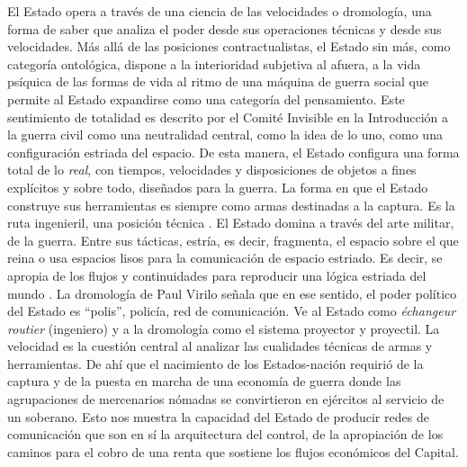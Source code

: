El Estado opera a través de una ciencia de las velocidades o dromología, una forma de saber que analiza el poder desde sus operaciones técnicas y desde sus velocidades. Más allá de las posiciones contractualistas, el Estado sin más, como categoría ontológica, dispone a la interioridad subjetiva al afuera, a la vida psíquica de las formas de vida al ritmo de una máquina de guerra social que permite al Estado expandirse como una categoría del pensamiento. Este sentimiento de totalidad es descrito por el Comité Invisible en la Introducción a la guerra civil como una neutralidad central, como la idea de lo uno, como una configuración estriada del espacio. De esta manera, el Estado configura una forma total de lo \emph{real}, con tiempos, velocidades y disposiciones de objetos a fines explícitos y sobre todo, diseñados para la guerra. La forma en que el Estado construye sus herramientas es siempre como armas destinadas a la captura. Es la ruta ingenieril, una posición técnica \autocite{comiteinvisibleNuestrosAmigos2015}. El Estado domina a través del arte militar, de la guerra. Entre sus tácticas, estría, es decir, fragmenta, el espacio sobre el que reina o usa espacios lisos para la comunicación de espacio estriado. Es decir, se apropia de los flujos y continuidades para reproducir una lógica estriada del mundo \autocite{deleuzeMilMesetasCapitalismo2002}. La dromología de Paul Virilo señala que en ese sentido, el poder político del Estado es \enquote{polis}, policía, red de comunicación. Ve al Estado como \emph{échangeur routier} (ingeniero) y a la dromología como el sistema proyector y proyectil. La velocidad es la cuestión central al analizar las cualidades técnicas de armas y herramientas. De ahí que el nacimiento de los Estados-nación requirió de la captura y de la puesta en marcha de una economía de guerra donde las agrupaciones de mercenarios nómadas se convirtieron en ejércitos al servicio de un soberano. Esto nos muestra la capacidad del Estado de producir redes de comunicación que son en sí la arquitectura del control, de la apropiación de los caminos para el cobro de una renta que sostiene los flujos económicos del Capital.

